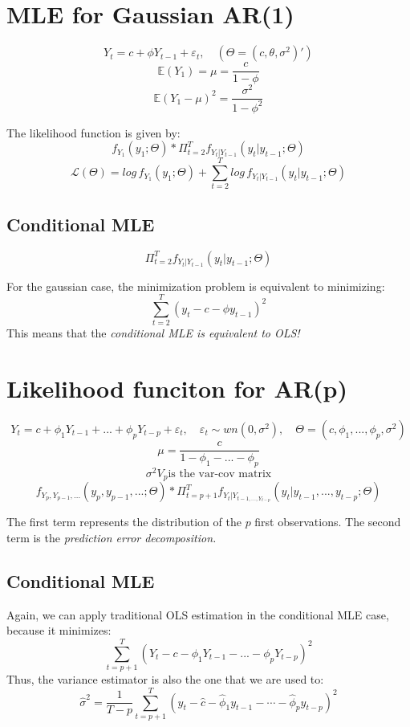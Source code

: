 \documentclass[11pt, a4paper]{report}
\theoremstyle{plain}
\theoremstyle{plain}
\theoremstyle{remark}
\begin{document}
\section{MLE for Gaussian AR(1)}
$$ Y_t = c + \phi Y_{t-1} + \varepsilon_{t}, \hspace{1em} (\Theta = (c, \theta, \sigma^2)') $$
$$ \mathbb{E}(Y_1) = \mu = \dfrac{c}{1- \phi}$$
$$ \mathbb{E}(Y_1 - \mu)^2 = \dfrac{\sigma^2}{1 - \phi^2} $$ 

The likelihood function is given by: 
$$f_{Y_1}(y_1; \Theta) * \Pi_{t=2}^T f_{Y_t| Y_{t-1}}(y_t | y_{t-1}; \Theta)$$ 
$$ \mathcal{L}(\Theta) = log \, f_{Y_1}(y_1; \Theta) + \sum_{t=2}^T log \, f_{Y_t| Y_{t-1}}(y_t | y_{t-1}; \Theta) $$

\subsection{Conditional MLE}

$$ \Pi_{t=2}^T f_{Y_t| Y_{t-1}}(y_t | y_{t-1}; \Theta) $$

For the gaussian case, the minimization problem is equivalent to minimizing:
$$ \sum_{t=2}^T (y_t - c - \phi y_{t-1})^2$$ 
This means that the \textit{conditional MLE is equivalent to OLS!}

\section{Likelihood funciton for AR(p)}

$$
Y_t = c + \phi_1 Y_{t-1} + ... + \phi_p Y_{t-p} + \varepsilon_{t}, \hspace{1em} \varepsilon_{t} \sim wn(0, \sigma^2), \hspace{1em} \Theta = (c, \phi_1, ..., \phi_p, \sigma^2) $$
$$ \mu = \dfrac{c}{1 - \phi_{1} - ... - \phi_{p}} $$
$$ \sigma^2 V_p \text{is the var-cov matrix}$$
$$ f_{Y_p, Y_{p-1},...}(y_p, y_{p-1},...; \Theta) * \Pi_{t = p+1}^T f_{Y_t | Y_{t-1, ..., Y_{t-p}}} (y_t | y_{t-1}, ..., y_{t-p}; \Theta)$$ 

The first term represents the distribution of the $p$ first observations. The second term is the \textit{prediction error decomposition.}

\subsection{Conditional MLE}

Again, we can apply traditional OLS estimation in the conditional MLE case, because it minimizes:
$$ \sum_{t = p+1}^T (Y_t - c - \phi_1 Y_{t-1} - ... - \phi_p Y_{t-p})^2 $$
Thus, the variance estimator is also the one that we are used to: 
$$\hat{\sigma}^{2}=\frac{1}{T-p} \sum_{t=p+1}^{T}\left(y_{t}-\hat{c}-\hat{\phi}_{1} y_{t-1}-\cdots-\hat{\phi}_{p} y_{t-p}\right)^{2}$$
\end{document}
